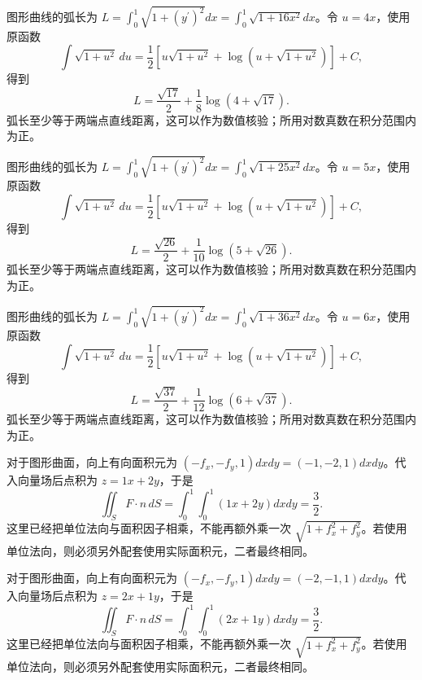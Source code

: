 \documentclass[UTF8,12pt,a4paper,fontset=fandol]{ctexart}
\begin{document}
\begin{solve}\label{ans:c42q4}
图形曲线的弧长为 $L=\int_0^1\sqrt{1+(y^{\prime})^2}dx=\int_0^1\sqrt{1+16x^2}dx$。令 $u=4x$，使用原函数
\[
\int\sqrt{1+u^2}\,du=\frac12\left[u\sqrt{1+u^2}+\log(u+\sqrt{1+u^2})\right]+C,
\]
得到
\[
L=\frac{\sqrt{17}}2+\frac{1}{8}\log(4+\sqrt{17}).
\]
弧长至少等于两端点直线距离，这可以作为数值核验；所用对数真数在积分范围内为正。
\end{solve}

\begin{solve}\label{ans:c42q5}
图形曲线的弧长为 $L=\int_0^1\sqrt{1+(y^{\prime})^2}dx=\int_0^1\sqrt{1+25x^2}dx$。令 $u=5x$，使用原函数
\[
\int\sqrt{1+u^2}\,du=\frac12\left[u\sqrt{1+u^2}+\log(u+\sqrt{1+u^2})\right]+C,
\]
得到
\[
L=\frac{\sqrt{26}}2+\frac{1}{10}\log(5+\sqrt{26}).
\]
弧长至少等于两端点直线距离，这可以作为数值核验；所用对数真数在积分范围内为正。
\end{solve}

\begin{solve}\label{ans:c42q6}
图形曲线的弧长为 $L=\int_0^1\sqrt{1+(y^{\prime})^2}dx=\int_0^1\sqrt{1+36x^2}dx$。令 $u=6x$，使用原函数
\[
\int\sqrt{1+u^2}\,du=\frac12\left[u\sqrt{1+u^2}+\log(u+\sqrt{1+u^2})\right]+C,
\]
得到
\[
L=\frac{\sqrt{37}}2+\frac{1}{12}\log(6+\sqrt{37}).
\]
弧长至少等于两端点直线距离，这可以作为数值核验；所用对数真数在积分范围内为正。
\end{solve}

\begin{solve}\label{ans:c42q7}
对于图形曲面，向上有向面积元为 $(-f_x,-f_y,1)dxdy=(-1,-2,1)dxdy$。代入向量场后点积为 $z=1x+2y$，于是
\[
\iint_SF\cdot n\,dS=\int_0^1\int_0^1(1x+2y)dxdy=\frac{3}{2}.
\]
这里已经把单位法向与面积因子相乘，不能再额外乘一次 $\sqrt{1+f_x^2+f_y^2}$。若使用单位法向，则必须另外配套使用实际面积元，二者最终相同。
\end{solve}

\begin{solve}\label{ans:c42q8}
对于图形曲面，向上有向面积元为 $(-f_x,-f_y,1)dxdy=(-2,-1,1)dxdy$。代入向量场后点积为 $z=2x+1y$，于是
\[
\iint_SF\cdot n\,dS=\int_0^1\int_0^1(2x+1y)dxdy=\frac{3}{2}.
\]
这里已经把单位法向与面积因子相乘，不能再额外乘一次 $\sqrt{1+f_x^2+f_y^2}$。若使用单位法向，则必须另外配套使用实际面积元，二者最终相同。
\end{solve}
\end{document}
